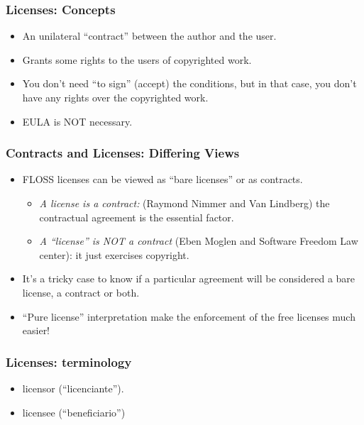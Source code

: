 
\begin{frame}
\frametitle{Licenses: Concepts}

\begin{itemize}
\item An unilateral ``contract'' between the author and the user.
\item Grants some rights to the users of copyrighted work.
\item You don't need ``to sign'' (accept) the conditions, but in that case, you don't have
any rights over the copyrighted work. 
\item EULA is NOT necessary.
\end{itemize}

\end{frame}



\begin{frame}
\frametitle{Contracts and Licenses: Differing Views}

\begin{itemize}
\item FLOSS licenses can be viewed as ``bare \alert{licenses}'' or as \alert{contracts}.
	\begin{itemize}
	\item \textit{A license is a contract:} (Raymond Nimmer and Van Lindberg) the contractual agreement is the essential factor. 
	\item \textit{A ``license'' is NOT a contract} (Eben Moglen and Software Freedom Law center): it just exercises copyright.
	\end{itemize}
\item It's a tricky case to know if a particular agreement will be considered a bare license, a contract  or both.
\item ``Pure license'' interpretation make the enforcement of the free licenses much easier!
\end{itemize}

\end{frame}


\begin{frame}
\frametitle{Licenses: terminology}

\begin{itemize}
\item licensor (``licenciante'').
\item licensee (``beneficiario'')
\end{itemize}

\end{frame}


